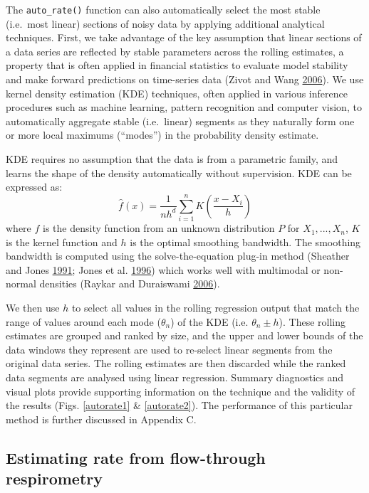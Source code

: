 \documentclass[a4paper,10pt, oneside]{memoir}
\begin{document}
The \texttt{auto\_rate()} function can also automatically select the most stable (i.e.~most linear) sections of noisy data by applying additional analytical techniques.
First, we take advantage of the key assumption that linear sections of a data series are reflected by stable parameters across the rolling estimates, a property that is often applied in financial statistics to evaluate model stability and make forward predictions on time-series data (Zivot and Wang \protect\hyperlink{ref-Zivot2006}{2006}).
We use kernel density estimation (KDE) techniques, often applied in various inference procedures such as machine learning, pattern recognition and computer vision, to automatically aggregate stable (i.e.~linear) segments as they naturally form one or more local maximums (``modes'') in the probability density estimate.

KDE requires no assumption that the data is from a parametric family, and learns the shape of the density automatically without supervision.
KDE can be expressed as: \[\hat{f}(x) = \frac{1}{nh^d}\sum_{i = 1}^{n} K \left(\frac{x - X_i}{h} \right)\] where \(f\) is the density function from an unknown distribution \(P\) for \(X_1,...,X_n\), \(K\) is the kernel function and \(h\) is the optimal smoothing bandwidth. The smoothing bandwidth is computed using the solve-the-equation plug-in method (Sheather and Jones \protect\hyperlink{ref-Sheather1991}{1991}; Jones et al. \protect\hyperlink{ref-Jones1996}{1996}) which works well with multimodal or non-normal densities (Raykar and Duraiswami \protect\hyperlink{ref-Raykar2006}{2006}).

We then use \(h\) to select all values in the rolling regression output that match the range of values around each mode (\(\theta_n\)) of the KDE (i.e. \(\theta_n \pm h\)). These rolling estimates are grouped and ranked by size, and the upper and lower bounds of the data windows they represent are used to re-select linear segments from the original data series. The rolling estimates are then discarded while the ranked data segments are analysed using linear regression. Summary diagnostics and visual plots provide supporting information on the technique and the validity of the results (Figs. \ref{autorate1} \& \ref{autorate2}).
The performance of this particular method is further discussed in Appendix C.

\subsection{Estimating rate from flow-through respirometry}
\end{document}
